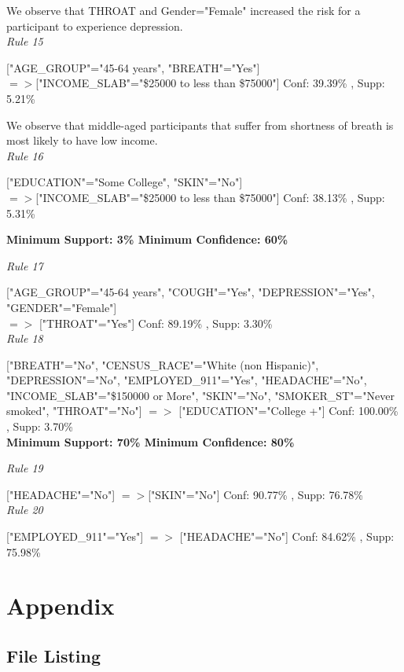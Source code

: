 \documentclass[11pt]{article}
\begin{document}
We observe that THROAT and Gender="Female" increased the risk for a participant to experience depression.\\

\textit{Rule 15}

["AGE\_GROUP"="45-64 years", "BREATH"="Yes"] \\
$=>$["INCOME\_SLAB"="\$25000 to less than \$75000"] Conf: 39.39\% , Supp: 5.21\% 

We observe that middle-aged participants that suffer from shortness of breath is most likely to have low income.
\\

\textit{Rule 16}

["EDUCATION"="Some College", "SKIN"="No"]\\
$=>$["INCOME\_SLAB"="\$25000 to less than \$75000"] Conf: 38.13\% , Supp: 5.31\% 

\textbf{Minimum Support: 3\% Minimum Confidence: 60\%}

\textit{Rule 17}

["AGE\_GROUP"="45-64 years", "COUGH"="Yes", "DEPRESSION"="Yes", "GENDER"="Female"] \\
$=>$ ["THROAT"="Yes"] Conf: 89.19\% , Supp: 3.30\%  \\

\textit{Rule 18}

["BREATH"="No", "CENSUS\_RACE"="White (non Hispanic)", "DEPRESSION"="No", "EMPLOYED\_911"="Yes", "HEADACHE"="No",
 "INCOME\_SLAB"="\$150000 or More", "SKIN"="No", "SMOKER\_ST"="Never smoked", "THROAT"="No"] 
 $=>$ ["EDUCATION"="College +"] Conf: 100.00\% , Supp: 3.70\%  \\

\textbf{Minimum Support: 70\% Minimum Confidence: 80\%}

\textit{Rule 19} 

["HEADACHE"="No"] $=>$["SKIN"="No"] Conf: 90.77\% , Supp: 76.78\% \\

\textit{Rule 20}

["EMPLOYED\_911"="Yes"] $=>$ ["HEADACHE"="No"] Conf: 84.62\% , Supp: 75.98\%   \\

\section* {Appendix}

\subsection* {File Listing}
\end{document}
